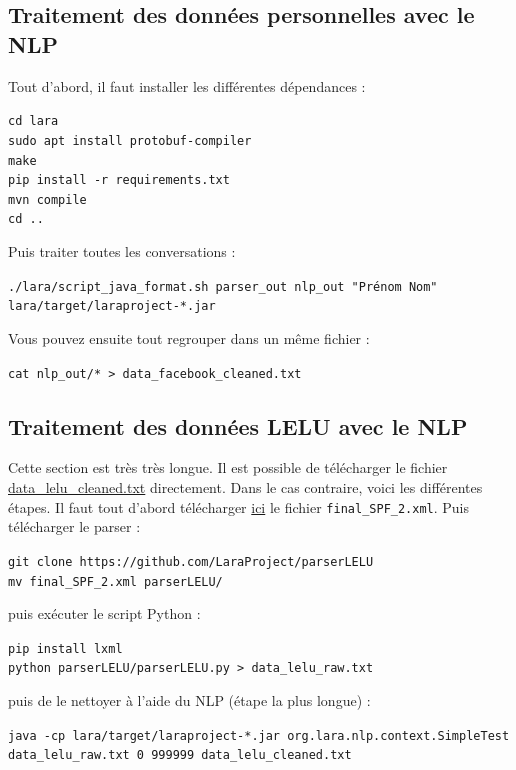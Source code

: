 \documentclass[10pt,a4paper]{article}
\begin{document}
\subsection{Traitement des données personnelles avec le NLP}
Tout d'abord, il faut installer les différentes dépendances :
\begin{center}
\texttt{cd lara} \\
\texttt{sudo apt install protobuf-compiler} \\
\texttt{make} \\
\texttt{pip install -r requirements.txt} \\
\texttt{mvn compile} \\
\texttt{cd ..} \\
\end{center}
Puis traiter toutes les conversations :
\begin{center}
\texttt{./lara/script\_java\_format.sh parser\_out nlp\_out "Prénom Nom" lara/target/laraproject-*.jar}
\end{center}
Vous pouvez ensuite tout regrouper dans un même fichier :
\begin{center}
\texttt{cat nlp\_out/* > data\_facebook\_cleaned.txt}
\end{center}
\subsection{Traitement des données LELU avec le NLP}
Cette section est très très longue. Il est possible de télécharger le fichier \href{https://drive.google.com/file/d/1suiEo0mGBEszMhmesoj-82Nywy2R7guF/view?usp=sharing}{data\_lelu\_cleaned.txt} directement. Dans le cas contraire, voici les différentes étapes. Il faut tout d'abord télécharger \href{https://www.kaggle.com/breandan/french-reddit-discussion}{ici} le fichier \texttt{final\_SPF\_2.xml}. Puis télécharger le parser :
\begin{center}
\texttt{git clone https://github.com/LaraProject/parserLELU} \\
\texttt{mv final\_SPF\_2.xml parserLELU/}
\end{center}
puis exécuter le script Python :
\begin{center}
\texttt{pip install lxml} \\
\texttt{python parserLELU/parserLELU.py > data\_lelu\_raw.txt}
\end{center}
puis de le nettoyer à l'aide du NLP (étape la plus longue) :
\begin{center}
\texttt{java -cp lara/target/laraproject-*.jar org.lara.nlp.context.SimpleTest data\_lelu\_raw.txt 0 999999 data\_lelu\_cleaned.txt}
\end{center}
\end{document}
